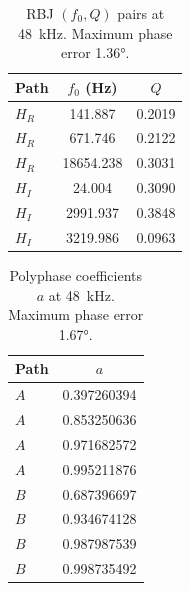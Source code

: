 \documentclass[11pt,a4paper]{article}
\begin{document}
\begin{table}[h]
\centering
\caption{RBJ $(f_0, Q)$ pairs at \SI{48}{\kilo\hertz}. Maximum phase error \ang{1.36}.}
\label{tab:rbj48}
\begin{tabular}{@{}lcc@{}}
\toprule
Path & $f_0$ (Hz) & $Q$ \\
\midrule
$H_R$ & 141.887   & 0.2019 \\
$H_R$ & 671.746   & 0.2122 \\
$H_R$ & 18654.238 & 0.3031 \\
\addlinespace
$H_I$ & 24.004    & 0.3090 \\
$H_I$ & 2991.937  & 0.3848 \\
$H_I$ & 3219.986  & 0.0963 \\
\bottomrule
\end{tabular}
\end{table}

\begin{table}[h]
\centering
\caption{Polyphase coefficients $a$ at \SI{48}{\kilo\hertz}. Maximum phase error \ang{1.67}.}
\label{tab:poly48}
\begin{tabular}{@{}lc@{}}
\toprule
Path & $a$ \\
\midrule
$A$ & 0.397260394 \\
$A$ & 0.853250636 \\
$A$ & 0.971682572 \\
$A$ & 0.995211876 \\
\addlinespace
$B$ & 0.687396697 \\
$B$ & 0.934674128 \\
$B$ & 0.987987539 \\
$B$ & 0.998735492 \\
\bottomrule
\end{tabular}
\end{table}



\end{document}
